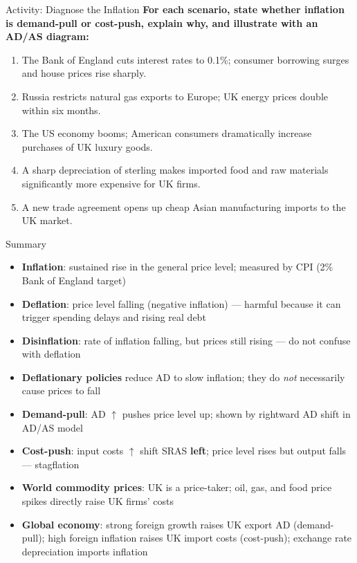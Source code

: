 \documentclass[16pt,aspectratio=169]{beamer}
\begin{document}
\begin{frame}{Activity: Diagnose the Inflation}
    \textbf{For each scenario, state whether inflation is demand-pull or cost-push, explain why, and illustrate with an AD/AS diagram:}

    \begin{enumerate}\setlength\itemsep{0.4em}
        \item The Bank of England cuts interest rates to 0.1\%; consumer borrowing surges and house prices rise sharply.
        \item Russia restricts natural gas exports to Europe; UK energy prices double within six months.
        \item The US economy booms; American consumers dramatically increase purchases of UK luxury goods.
        \item A sharp depreciation of sterling makes imported food and raw materials significantly more expensive for UK firms.
        \item A new trade agreement opens up cheap Asian manufacturing imports to the UK market.
    \end{enumerate}
\end{frame}

\begin{frame}[allowframebreaks]{Summary}
    \begin{itemize}\setlength\itemsep{0.3em}
        \item \textbf{Inflation}: sustained rise in the general price level; measured by CPI (2\% Bank of England target)
        \item \textbf{Deflation}: price level falling (negative inflation) --- harmful because it can trigger spending delays and rising real debt
        \item \textbf{Disinflation}: rate of inflation falling, but prices still rising --- do not confuse with deflation
        \item \textbf{Deflationary policies} reduce AD to slow inflation; they do \textit{not} necessarily cause prices to fall
        \item \textbf{Demand-pull}: AD $\uparrow$ pushes price level up; shown by rightward AD shift in AD/AS model
        \item \textbf{Cost-push}: input costs $\uparrow$ shift SRAS \textbf{left}; price level rises but output falls --- stagflation
        \item \textbf{World commodity prices}: UK is a price-taker; oil, gas, and food price spikes directly raise UK firms' costs
        \item \textbf{Global economy}: strong foreign growth raises UK export AD (demand-pull); high foreign inflation raises UK import costs (cost-push); exchange rate depreciation imports inflation
    \end{itemize}
\end{frame}
\end{document}
